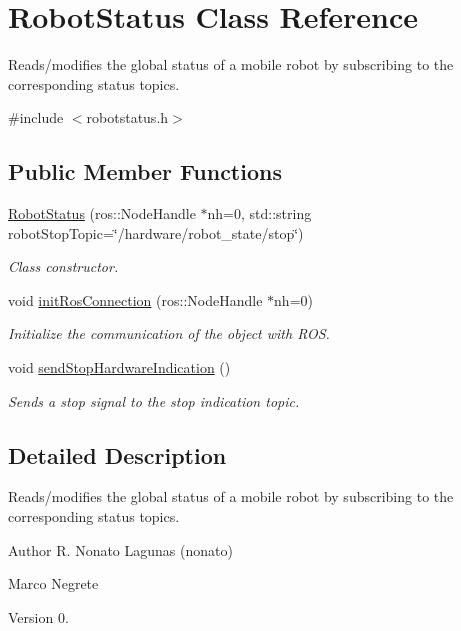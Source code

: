 \hypertarget{class_robot_status}{}\section{Robot\+Status Class Reference}
\label{class_robot_status}


Reads/modifies the global status of a mobile robot by subscribing to the corresponding status topics.  




{\ttfamily \#include $<$robotstatus.\+h$>$}

\subsection*{Public Member Functions}
\begin{DoxyCompactItemize}
\item 
\hyperlink{class_robot_status_a89e6e95e22134fef8182ec21fd37dc77}{Robot\+Status} (ros\+::\+Node\+Handle $\ast$nh=0, std\+::string robot\+Stop\+Topic=\char`\"{}/hardware/robot\+\_\+state/stop\char`\"{})
\begin{DoxyCompactList}\small\item\em Class constructor. \end{DoxyCompactList}\item 
void \hyperlink{class_robot_status_aeb99cb47b714b8a03d432c1ec13b4089}{init\+Ros\+Connection} (ros\+::\+Node\+Handle $\ast$nh=0)
\begin{DoxyCompactList}\small\item\em Initialize the communication of the object with R\+OS. \end{DoxyCompactList}\item 
void \hyperlink{class_robot_status_ac253da405e6303949c3d48e773ce29e9}{send\+Stop\+Hardware\+Indication} ()
\begin{DoxyCompactList}\small\item\em Sends a stop signal to the stop indication topic. \end{DoxyCompactList}\end{DoxyCompactItemize}


\subsection{Detailed Description}
Reads/modifies the global status of a mobile robot by subscribing to the corresponding status topics. 

\begin{DoxyAuthor}{Author}
R. Nonato Lagunas (nonato) 

Marco Negrete 
\end{DoxyAuthor}
\begin{DoxyVersion}{Version}
0. 
\end{DoxyVersion}


